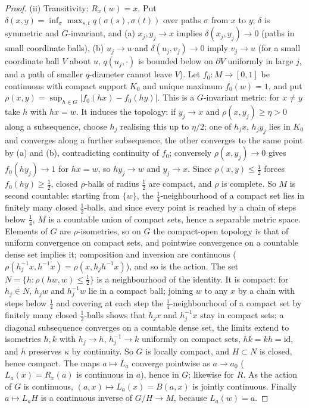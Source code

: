 \documentclass[11pt,reqno]{amsart}
\theoremstyle{definition}
\theoremstyle{remark}
\numberwithin{equation}{section}
\begin{document}
\begin{proof}
(ii) Transitivity: $R_x(w)=x$.  Put $\delta(x,y)=\inf_\sigma\max_{s,t}q(\sigma(s),\sigma(t))$ over paths $\sigma$ from $x$ to $y$; $\delta$ is symmetric and
$G$-invariant, and (a) $x_j,y_j\to x$ implies $\delta(x_j,y_j)\to0$ (paths in small coordinate balls), (b) $u_j\to u$ and $\delta(u_j,v_j)\to0$
imply $v_j\to u$ (for a small coordinate ball $V$ about $u$, $q(u_j,\cdot)$ is bounded below on $\partial V$ uniformly in large $j$, and a path of
smaller $q$-diameter cannot leave $V$).  Let $f_0\colon M\to[0,1]$ be continuous with compact support $K_0$ and unique maximum $f_0(w)=1$, and put
$\rho(x,y)=\sup_{h\in G}\lvert f_0(hx)-f_0(hy)\rvert$.  This is a $G$-invariant metric: for $x\ne y$ take $h$ with $hx=w$.  It induces the topology: if
$y_j\to x$ and $\rho(x,y_j)\ge\eta>0$ along a subsequence, choose $h_j$ realising this up to $\eta/2$; one of $h_jx$, $h_jy_j$ lies in $K_0$ and
converges along a further subsequence, the other converges to the same point by (a) and (b), contradicting continuity of $f_0$; conversely
$\rho(x,y_j)\to0$ gives $f_0(hy_j)\to1$ for $hx=w$, so $hy_j\to w$ and $y_j\to x$.  Since $\rho(x,y)\le\frac12$ forces $f_0(hy)\ge\frac12$, closed
$\rho$-balls of radius $\frac12$ are compact, and $\rho$ is complete.  So $M$ is second countable: starting from $\{w\}$, the
$\frac14$-neighbourhood of a compact set lies in finitely many closed $\frac12$-balls, and since every point is reached by a chain of steps
below $\frac14$, $M$ is a countable union of compact sets, hence a separable metric space.  Elements of $G$ are $\rho$-isometries, so on $G$ the compact-open topology is
that of uniform convergence on compact sets, and pointwise convergence on a countable dense set implies it; composition and inversion
are continuous ($\rho(h_j^{-1}x,h^{-1}x)=\rho(x,h_jh^{-1}x)$), and so is the action.  The set $N=\{h:\rho(hw,w)\le\frac12\}$ is a neighbourhood of
the identity.  It is compact: for $h_j\in N$, $h_jw$ and $h_j^{-1}w$ lie in a compact ball; joining $w$ to any $x$ by a chain with steps below
$\frac14$ and covering at each step the $\frac14$-neighbourhood of a compact set by finitely many closed $\frac12$-balls shows that $h_jx$ and
$h_j^{-1}x$ stay in compact sets; a diagonal subsequence converges on a countable dense set, the limits extend to isometries $h,k$ with
$h_j\to h$, $h_j^{-1}\to k$ uniformly on compact sets, $hk=kh=\mathrm{id}$, and $h$ preserves $\kappa$ by continuity.  So $G$ is locally
compact, and $H\subset N$ is closed, hence compact.  The maps $a\mapsto L_a$ converge pointwise as $a\to a_0$ ($L_a(x)=R_x(a)$ is
continuous in $a$), hence in $G$; likewise for $R$.  As the action of $G$ is continuous, $(a,x)\mapsto L_a(x)=B(a,x)$ is jointly continuous.
Finally $a\mapsto L_aH$ is a continuous inverse of $G/H\to M$, because
$L_a(w)=a$.
\end{proof}
\end{document}
